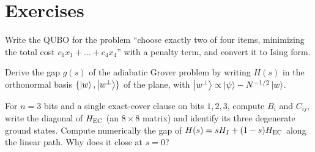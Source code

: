\section{Exercises}
\begin{exercise}
Write the QUBO for the problem ``choose exactly two of four items, minimizing the total cost $c_1x_1+\dots+c_4x_4$'' with a penalty term, and convert it to Ising form.
\end{exercise}
\begin{exercise}
Derive the gap $g(s)$ of the adiabatic Grover problem by writing $H(s)$ in the orthonormal basis $\{\left|w\right\rangle,\left|w^\perp\right\rangle\}$ of the plane, with $\left|w^\perp\right\rangle\propto\left|\psi\right\rangle-N^{-1/2}\left|w\right\rangle$.
\end{exercise}
\begin{exercise}
For $n=3$ bits and a single exact-cover clause on bits $1,2,3$, compute $B_i$ and $C_{ij}$, write the diagonal of $H_{\rm EC}$ (an $8\times8$ matrix) and identify its three degenerate ground states. Compute numerically the gap of $H(s)=sH_I+(1-s)H_{\rm EC}$ along the linear path. Why does it close at $s=0$?
\end{exercise}
